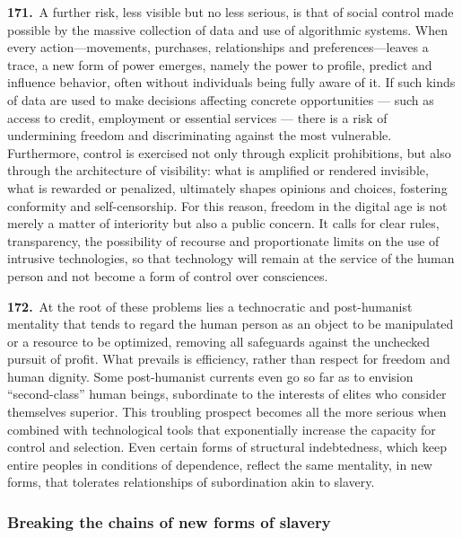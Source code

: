 \documentclass{article}
\begin{document}
\textbf{171.}\ A further risk, less visible but no less serious, is that of social control made possible by the massive collection of data and use of algorithmic systems. When every action---movements, purchases, relationships and preferences---leaves a trace, a new form of power emerges, namely the power to profile, predict and influence behavior, often without individuals being fully aware of it. If such kinds of data are used to make decisions affecting concrete opportunities --- such as access to credit, employment or essential services --- there is a risk of undermining freedom and discriminating against the most vulnerable. Furthermore, control is exercised not only through explicit prohibitions, but also through the architecture of visibility: what is amplified or rendered invisible, what is rewarded or penalized, ultimately shapes opinions and choices, fostering conformity and self-censorship. For this reason, freedom in the digital age is not merely a matter of interiority but also a public concern. It calls for clear rules, transparency, the possibility of recourse and proportionate limits on the use of intrusive technologies, so that technology will remain at the service of the human person and not become a form of control over consciences.

\textbf{172.}\ At the root of these problems lies a technocratic and post-humanist mentality that tends to regard the human person as an object to be manipulated or a resource to be optimized,\cite{n172} removing all safeguards against the unchecked pursuit of profit. What prevails is efficiency, rather than respect for freedom and human dignity. Some post-humanist currents even go so far as to envision ``second-class'' human beings, subordinate to the interests of elites who consider themselves superior. This troubling prospect becomes all the more serious when combined with technological tools that exponentially increase the capacity for control and selection. Even certain forms of structural indebtedness, which keep entire peoples in conditions of dependence, reflect the same mentality, in new forms, that tolerates relationships of subordination akin to slavery.

\subsubsection{Breaking the chains of new forms of slavery}
\end{document}
